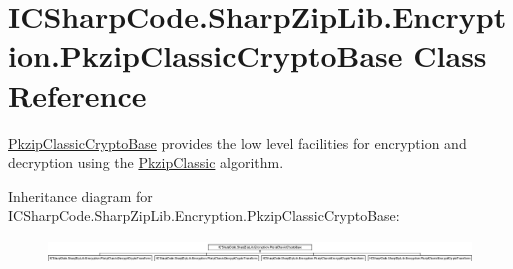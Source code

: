 \hypertarget{class_i_c_sharp_code_1_1_sharp_zip_lib_1_1_encryption_1_1_pkzip_classic_crypto_base}{}\section{I\+C\+Sharp\+Code.\+Sharp\+Zip\+Lib.\+Encryption.\+Pkzip\+Classic\+Crypto\+Base Class Reference}
\label{class_i_c_sharp_code_1_1_sharp_zip_lib_1_1_encryption_1_1_pkzip_classic_crypto_base}


\hyperlink{class_i_c_sharp_code_1_1_sharp_zip_lib_1_1_encryption_1_1_pkzip_classic_crypto_base}{Pkzip\+Classic\+Crypto\+Base} provides the low level facilities for encryption and decryption using the \hyperlink{class_i_c_sharp_code_1_1_sharp_zip_lib_1_1_encryption_1_1_pkzip_classic}{Pkzip\+Classic} algorithm.  


Inheritance diagram for I\+C\+Sharp\+Code.\+Sharp\+Zip\+Lib.\+Encryption.\+Pkzip\+Classic\+Crypto\+Base\+:\begin{figure}[H]
\begin{center}
\leavevmode
\includegraphics[height=0.622222cm]{class_i_c_sharp_code_1_1_sharp_zip_lib_1_1_encryption_1_1_pkzip_classic_crypto_base}
\end{center}
\end{figure}
